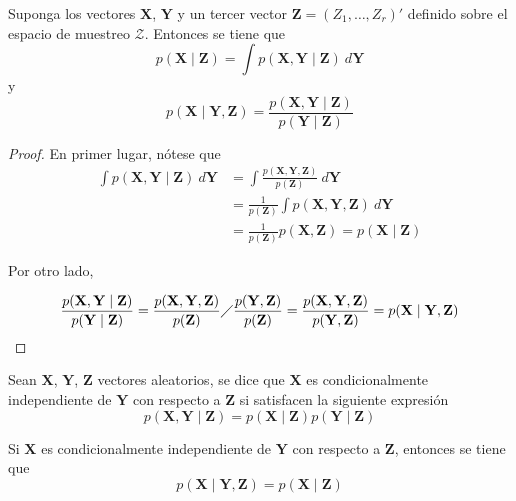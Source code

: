 \begin{Res}\label{Res121}
Suponga los vectores $\mathbf{X}$, $\mathbf{Y}$ y un tercer vector $\mathbf{Z}=(Z_1,\ldots,Z_r)'$ definido sobre el espacio de muestreo  $\mathcal{Z}$. Entonces se tiene que
\begin{equation}
p(\mathbf{X} \mid \mathbf{Z})=\int p(\mathbf{X},\mathbf{Y} \mid \mathbf{Z})\ d\mathbf{Y}
\end{equation}
y
\begin{equation}
p(\mathbf{X} \mid \mathbf{Y},\mathbf{Z})=\frac{p(\mathbf{X},\mathbf{Y} \mid \mathbf{Z})}{p(\mathbf{Y} \mid \mathbf{Z})}
\end{equation}
\end{Res}

\begin{proof}
En primer lugar, nótese que
\begin{align*}
\int p(\mathbf{X},\mathbf{Y} \mid \mathbf{Z})\ d\mathbf{Y}&=
\int \frac{p(\mathbf{X},\mathbf{Y},\mathbf{Z})}{p(\mathbf{Z})}\ d\mathbf{Y}\\
&=\frac{1}{p(\mathbf{Z})} \int p(\mathbf{X},\mathbf{Y},\mathbf{Z}) \ d\mathbf{Y}\\
&=\frac{1}{p(\mathbf{Z})} p(\mathbf{X},\mathbf{Z})=p(\mathbf{X} \mid \mathbf{Z})
\end{align*}

Por otro lado,

\begin{align*}
\frac{p(\mathbf{X},\mathbf{Y} \mid \mathbf{Z})}{p(\mathbf{Y} \mid \mathbf{Z})}=
\frac{p(\mathbf{X},\mathbf{Y},\mathbf{Z})}{p(\mathbf{Z})} \diagup
\frac{p(\mathbf{Y},\mathbf{Z})}{p(\mathbf{Z})}
=\frac{p(\mathbf{X},\mathbf{Y},\mathbf{Z})}{p(\mathbf{Y},\mathbf{Z})}=p(\mathbf{X} \mid \mathbf{Y},\mathbf{Z})
\end{align*}
\end{proof}

\begin{Defi}
Sean $\mathbf{X}$, $\mathbf{Y}$, $\mathbf{Z}$ vectores aleatorios, se dice que $\mathbf{X}$ es condicionalmente independiente de $\mathbf{Y}$ con respecto a $\mathbf{Z}$ si satisfacen la siguiente expresión
\begin{equation}
p(\mathbf{X},\mathbf{Y} \mid \mathbf{Z})=p(\mathbf{X} \mid \mathbf{Z})p(\mathbf{Y} \mid \mathbf{Z})
\end{equation}
\end{Defi}

\begin{Res}\label{Res122}
Si $\mathbf{X}$ es condicionalmente independiente de $\mathbf{Y}$ con respecto a $\mathbf{Z}$, entonces se tiene que
\begin{equation}
p(\mathbf{X} \mid \mathbf{Y},\mathbf{Z})=p(\mathbf{X} \mid \mathbf{Z})
\end{equation}
\end{Res}

